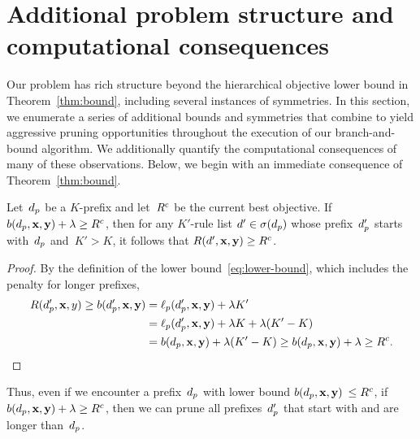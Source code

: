 \section{Additional problem structure and computational consequences}

Our problem has rich structure beyond the hierarchical objective lower bound
in Theorem~\ref{thm:bound}, including several instances of symmetries.
%
In this section, we enumerate a series of additional bounds and
symmetries that combine to yield aggressive pruning opportunities
throughout the execution of our branch-and-bound algorithm.
%
We additionally quantify the computational consequences of many
of these observations.
%
Below, we begin with an immediate consequence of Theorem~\ref{thm:bound}.

\begin{lemma}
\label{lemma:lookahead}
Let~$d_p$ be a $K$-prefix
and let~${R^c}$ be the current best objective.
%
If ${b(d_p, \mathbf{x}, \mathbf{y}) + {\lambda} \ge {R^c}}$,
then for any $K'$-rule list ${{d}' \in \sigma(d_p)}$
whose prefix~$d_p'$ starts with~$d_p$ and~${K' > K}$,
it follows that ${R({d}', \mathbf{x}, \mathbf{y}) \ge {R^c}}$.
\end{lemma}

\begin{arxiv}
\begin{proof}
By the definition of the lower bound~\eqref{eq:lower-bound},
which includes the penalty for longer prefixes,
\begin{align}
\Obj(\Prefix', \x, y) \ge b(\Prefix', \x, \y) &= \Loss_p(\Prefix', \x, \y) + \Reg K' \nn \\
&= \Loss_p(\Prefix', \x, \y) + \Reg K + \Reg (K' - K) \nn \\
&= b(\Prefix, \x, \y) + \Reg (K' - K)
\ge b(\Prefix, \x, \y) + \Reg \ge \CurrentObj.
\label{eq:lookahead}
\end{align}
\end{proof}
\end{arxiv}

Thus, even if we encounter a prefix~$d_p$
with lower bound ${b(d_p, \mathbf{x}, \mathbf{y})}$ ${\le {R^c}}$,
if ${b(d_p, \mathbf{x}, \mathbf{y}) + {\lambda} \ge {R^c}}$, then we can prune
all prefixes~$d_p'$ that start with and are longer than~$d_p$. \\

